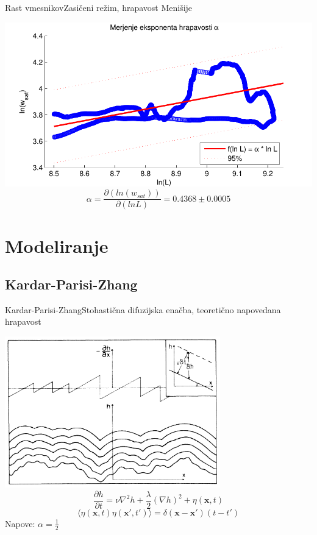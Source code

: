 \documentclass{beamer}
\begin{document}
\begin{frame}{Rast vmesnikov}{Zasičeni režim, hrapavost Menišije}
\begin{center}
  \footnotesize
  \hspace*{-0.04\textwidth}\includegraphics[width=1.1\textwidth]{slike/menisija-alfa}
  \begin{equation} \alpha = \frac{\partial ( ln (w_{sat}) ) }{\partial ( ln L )} =  0.4368 \pm 0.0005 \end{equation}
\end{center}
\end{frame}


\section{Modeliranje}

\subsection{Kardar-Parisi-Zhang}

\begin{frame}{Kardar-Parisi-Zhang}{Stohastična difuzijska enačba, teoretično napovedana hrapavost}
\begin{center}
  \footnotesize
  \includegraphics[width=0.7\textwidth]{slike/kpz}
  \begin{equation} \frac{\partial h}{\partial t} = \nu \nabla^2 h + \frac{\lambda}{2} (\nabla h)^2 + \eta (\mathbf{x},t) \end{equation}
  \begin{equation} \langle \eta(\mathbf{x},t) \eta(\mathbf{x'},t')\rangle = \delta(\mathbf{x}-\mathbf{x'})(t-t') \end{equation}
  Napove: $\alpha = \frac{1}{2}$
\end{center}
\end{frame}
\end{document}
